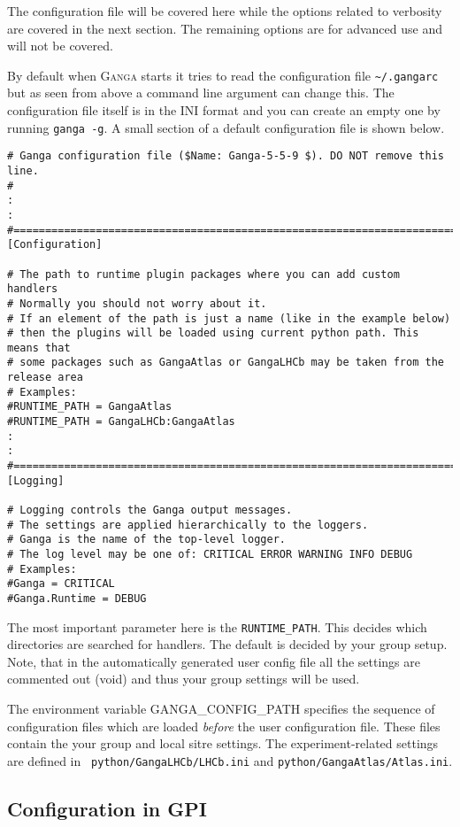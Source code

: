\documentclass{howto}
\def\ganga {\textsc{Ganga}\xspace}
\begin{document}
The configuration file will be covered here while the options related to
verbosity are covered in the next section. The remaining options are for
advanced use and will not be covered.

By default when \ganga starts  it tries to read the configuration file
\texttt{\~{}/.gangarc} but  as seen from  above a command  line argument
can change  this. The configuration file  itself is in  the INI format
and you can create an empty  one by running \texttt{ganga -g}. A small
section of a default configuration file is shown below.

\begin{verbatim}
# Ganga configuration file ($Name: Ganga-5-5-9 $). DO NOT remove this line.
#
:
:
#=======================================================================
[Configuration]

# The path to runtime plugin packages where you can add custom handlers
# Normally you should not worry about it.
# If an element of the path is just a name (like in the example below)
# then the plugins will be loaded using current python path. This means that
# some packages such as GangaAtlas or GangaLHCb may be taken from the release area
# Examples:
#RUNTIME_PATH = GangaAtlas
#RUNTIME_PATH = GangaLHCb:GangaAtlas
:
:
#=======================================================================
[Logging]

# Logging controls the Ganga output messages.
# The settings are applied hierarchically to the loggers.
# Ganga is the name of the top-level logger.
# The log level may be one of: CRITICAL ERROR WARNING INFO DEBUG
# Examples:
#Ganga = CRITICAL
#Ganga.Runtime = DEBUG
\end{verbatim}

The most  important parameter here is  the \texttt{RUNTIME_PATH}. This
decides which  directories are searched  for handlers. The  default is
decided by your group setup. Note, that in the automatically generated
user config  file all the settings  are commented out  (void) and thus
your group settings will be used. 

The environment  variable GANGA_CONFIG_PATH specifies  the sequence of
configuration   files  which   are  loaded   {\it  before}   the  user
configuration  file.  These  files contain  the your  group  and local
sitre settings.   The experiment-related settings are  defined in {\tt
python/GangaLHCb/LHCb.ini} and {\tt python/GangaAtlas/Atlas.ini}.

\subsection{Configuration in GPI}
\end{document}
